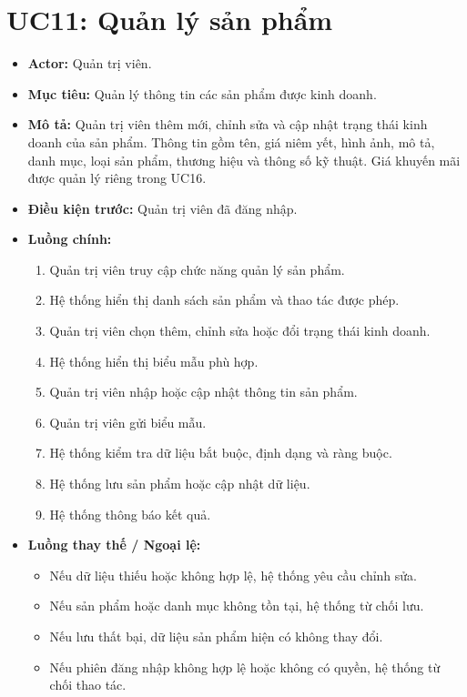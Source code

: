\section{UC11: Quản lý sản phẩm}
\begin{itemize}
    \item \textbf{Actor:} Quản trị viên.
    \item \textbf{Mục tiêu:} Quản lý thông tin các sản phẩm được kinh doanh.
    \item \textbf{Mô tả:} Quản trị viên thêm mới, chỉnh sửa và cập nhật trạng thái kinh doanh của sản phẩm. Thông tin gồm tên, giá niêm yết, hình ảnh, mô tả, danh mục, loại sản phẩm, thương hiệu và thông số kỹ thuật. Giá khuyến mãi được quản lý riêng trong UC16.
    \item \textbf{Điều kiện trước:} Quản trị viên đã đăng nhập.
    \item \textbf{Luồng chính:}
    \begin{enumerate}
        \item Quản trị viên truy cập chức năng quản lý sản phẩm.
        \item Hệ thống hiển thị danh sách sản phẩm và thao tác được phép.
        \item Quản trị viên chọn thêm, chỉnh sửa hoặc đổi trạng thái kinh doanh.
        \item Hệ thống hiển thị biểu mẫu phù hợp.
        \item Quản trị viên nhập hoặc cập nhật thông tin sản phẩm.
        \item Quản trị viên gửi biểu mẫu.
        \item Hệ thống kiểm tra dữ liệu bắt buộc, định dạng và ràng buộc.
        \item Hệ thống lưu sản phẩm hoặc cập nhật dữ liệu.
        \item Hệ thống thông báo kết quả.
    \end{enumerate}
    \item \textbf{Luồng thay thế / Ngoại lệ:}
    \begin{itemize}
        \item Nếu dữ liệu thiếu hoặc không hợp lệ, hệ thống yêu cầu chỉnh sửa.
        \item Nếu sản phẩm hoặc danh mục không tồn tại, hệ thống từ chối lưu.
        \item Nếu lưu thất bại, dữ liệu sản phẩm hiện có không thay đổi.
        \item Nếu phiên đăng nhập không hợp lệ hoặc không có quyền, hệ thống từ chối thao tác.
    \end{itemize}

\end{itemize}
